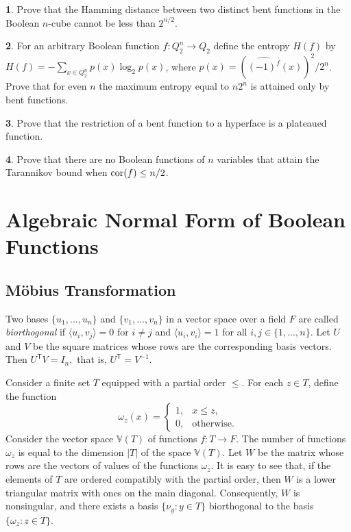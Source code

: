 \documentclass[11pt]{article}
\theoremstyle{definition}
\newtheorem{exercise}{\quad}
\newcommand{\cor}{{\rm cor}}
\begin{document}
{{{\begin{exercise}
Prove that the Hamming distance between two distinct
bent functions in the  Boolean $n$-cube cannot be less than
$2^{n/2}$.
\end{exercise}

\begin{exercise}
For an arbitrary Boolean function $f:Q_2^n\rightarrow Q_2$ define
the entropy $H(f)$ by $H(f)=-\sum\limits_{x\in Q_2^n}p(x)\log_2
p(x)$, where $p(x)=(\widehat{(-1)^f}(x))^2/2^{n}$. Prove that for
even $n$ the maximum entropy equal to $n2^n$ is attained only by
bent functions.
\end{exercise}

\begin{exercise}
Prove that the restriction of a bent function to a hyperface is a
plateaued function.
\end{exercise}

\begin{exercise}
Prove that there are no Boolean functions of $n$ variables
that attain the Tarannikov bound when $\cor(f)\leq n/2$.
\end{exercise}



\section{Algebraic Normal Form of Boolean Functions}

\subsection{Möbius Transformation}

Two bases $\{u_1,\dots,u_n\}$ and $\{v_1,\dots,v_n\}$ in a vector
space over a field $F$ are called {\sl biorthogonal} if
$\langle u_i,v_j\rangle=0$ for $i\neq j$ and
$\langle u_i,v_i\rangle=1$ for all $i,j\in\{1,\dots,n\}$.
Let $U$ and $V$ be the square matrices whose rows are the
corresponding basis vectors. Then
$
U^{\mathsf T}V=I_n,
$
that is,
$
U^{\mathsf T}=V^{-1}.
$

Consider a finite set $T$ equipped with a partial order $\leq$.
For each $z\in T$, define the function
\[
\omega_z(x)=
\begin{cases}
1,&x\leq z,\\
0,&\text{otherwise}.
\end{cases}
\]
Consider the vector space $\mathbb{V}(T)$ of functions
$f:T\rightarrow F$. The number of functions $\omega_z$ is equal to
the dimension $|T|$ of the space $\mathbb{V}(T)$. Let $W$ be the
matrix whose rows are the vectors of values of the functions
$\omega_z$. It is easy to see that, if the elements of $T$ are
ordered compatibly with the partial order, then $W$ is a lower
triangular matrix with ones on the main diagonal. Consequently,
$W$ is nonsingular, and there exists a basis
$\{\nu_y:y\in T\}$ biorthogonal to the basis $\{\omega_z:z\in T\}$.

}}}
\end{document}
